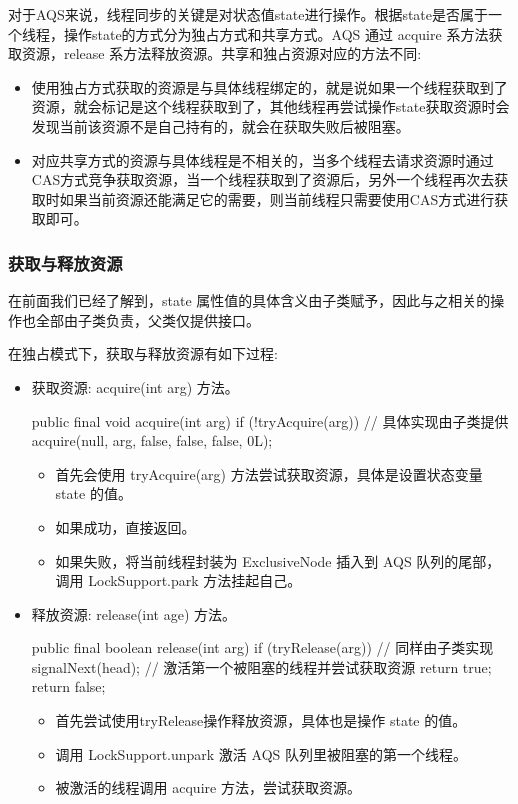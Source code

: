 对于AQS来说，线程同步的关键是对状态值state进行操作。根据state是否属于一个线程，操作state的方式分为独占方式和共享方式。AQS 通过 acquire 系方法获取资源，release 系方法释放资源。共享和独占资源对应的方法不同:

\begin{itemize}
    \item 使用独占方式获取的资源是与具体线程绑定的，就是说如果一个线程获取到了资源，就会标记是这个线程获取到了，其他线程再尝试操作state获取资源时会发现当前该资源不是自己持有的，就会在获取失败后被阻塞。
    \item 对应共享方式的资源与具体线程是不相关的，当多个线程去请求资源时通过CAS方式竞争获取资源，当一个线程获取到了资源后，另外一个线程再次去获取时如果当前资源还能满足它的需要，则当前线程只需要使用CAS方式进行获取即可。
\end{itemize}

\subsubsection*{获取与释放资源}

在前面我们已经了解到，state 属性值的具体含义由子类赋予，因此与之相关的操作也全部由子类负责，父类仅提供接口。

在独占模式下，获取与释放资源有如下过程:

\begin{itemize}
    \item 获取资源: acquire(int arg) 方法。
\begin{Java}
public final void acquire(int arg) {
    if (!tryAcquire(arg))   // 具体实现由子类提供
        acquire(null, arg, false, false, false, 0L);
}
\end{Java}
    \begin{itemize}
        \item 首先会使用 tryAcquire(arg) 方法尝试获取资源，具体是设置状态变量 state 的值。
        \item 如果成功，直接返回。
        \item 如果失败，将当前线程封装为 ExclusiveNode 插入到 AQS 队列的尾部，调用 LockSupport.park 方法挂起自己。
    \end{itemize}
    \item 释放资源: release(int age) 方法。
\begin{Java}
public final boolean release(int arg) {
    if (tryRelease(arg)) {  // 同样由子类实现
        signalNext(head);   // 激活第一个被阻塞的线程并尝试获取资源
        return true;
    }
    return false;
}
\end{Java}
    \begin{itemize}
        \item 首先尝试使用tryRelease操作释放资源，具体也是操作 state 的值。
        \item 调用 LockSupport.unpark 激活 AQS 队列里被阻塞的第一个线程。
        \item 被激活的线程调用 acquire 方法，尝试获取资源。
    \end{itemize}
\end{itemize}

